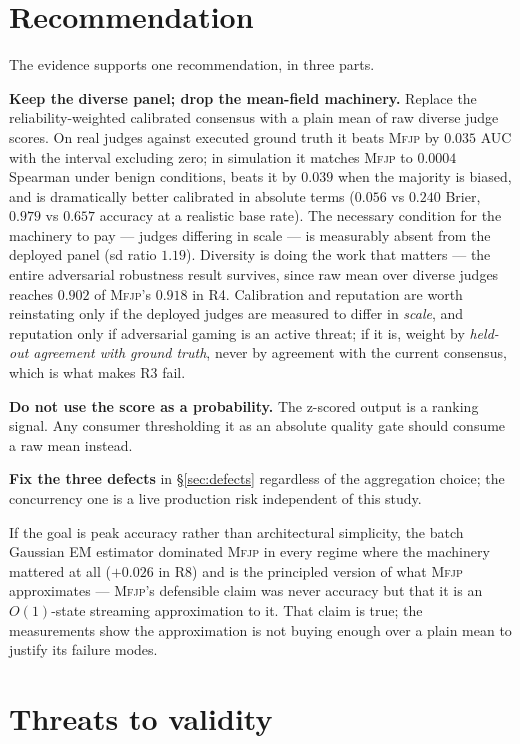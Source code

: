 \documentclass[11pt]{article}
\theoremstyle{definition}
\newcommand{\mfjp}{\textsc{Mfjp}}
\begin{document}
\section{Recommendation}

The evidence supports one recommendation, in three parts.

\textbf{Keep the diverse panel; drop the mean-field machinery.} Replace the
reliability-weighted calibrated consensus with a plain mean of raw diverse judge scores. On
real judges against executed ground truth it beats \mfjp{} by $0.035$ AUC with the interval
excluding zero; in simulation it matches \mfjp{} to $0.0004$ Spearman under benign conditions,
beats it by $0.039$ when the majority is biased, and is dramatically better calibrated in
absolute terms ($0.056$ vs $0.240$ Brier, $0.979$ vs $0.657$ accuracy at a realistic base
rate). The necessary condition for the machinery to pay --- judges differing in scale --- is
measurably absent from the deployed panel (sd ratio $1.19$). Diversity is doing the
work that matters --- the entire adversarial robustness result survives, since raw mean over
diverse judges reaches $0.902$ of \mfjp{}'s $0.918$ in R4. Calibration and reputation are
worth reinstating only if the deployed judges are measured to differ in \emph{scale}, and
reputation only if adversarial gaming is an active threat; if it is, weight by
\emph{held-out agreement with ground truth}, never by agreement with the current consensus,
which is what makes R3 fail.

\textbf{Do not use the score as a probability.} The z-scored output is a ranking signal.
Any consumer thresholding it as an absolute quality gate should consume a raw mean instead.

\textbf{Fix the three defects} in \S\ref{sec:defects} regardless of the aggregation choice;
the concurrency one is a live production risk independent of this study.

If the goal is peak accuracy rather than architectural simplicity, the batch Gaussian EM
estimator dominated \mfjp{} in every regime where the machinery mattered at all
($+0.026$ in R8) and is the principled version of what \mfjp{} approximates --- \mfjp{}'s
defensible claim was never accuracy but that it is an $O(1)$-state streaming approximation to
it. That claim is true; the measurements show the approximation is not buying enough over a
plain mean to justify its failure modes.

\section{Threats to validity}
\end{document}
